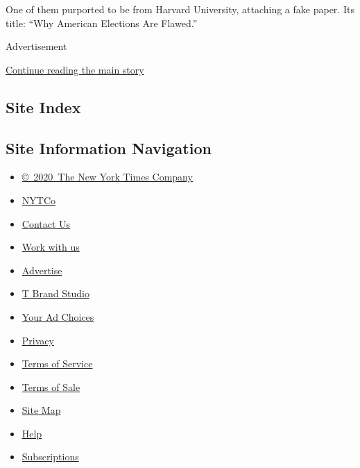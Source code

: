 One of them purported to be from Harvard University, attaching a fake
paper. Its title: ``Why American Elections Are Flawed.''

Advertisement

\protect\hyperlink{after-bottom}{Continue reading the main story}

\hypertarget{site-index}{%
\subsection{Site Index}\label{site-index}}

\hypertarget{site-information-navigation}{%
\subsection{Site Information
Navigation}\label{site-information-navigation}}

\begin{itemize}
\tightlist
\item
  \href{https://help.nytimes.com/hc/en-us/articles/115014792127-Copyright-notice}{©~2020~The
  New York Times Company}
\end{itemize}

\begin{itemize}
\tightlist
\item
  \href{https://www.nytco.com/}{NYTCo}
\item
  \href{https://help.nytimes.com/hc/en-us/articles/115015385887-Contact-Us}{Contact
  Us}
\item
  \href{https://www.nytco.com/careers/}{Work with us}
\item
  \href{https://nytmediakit.com/}{Advertise}
\item
  \href{http://www.tbrandstudio.com/}{T Brand Studio}
\item
  \href{https://www.nytimes.com/privacy/cookie-policy\#how-do-i-manage-trackers}{Your
  Ad Choices}
\item
  \href{https://www.nytimes.com/privacy}{Privacy}
\item
  \href{https://help.nytimes.com/hc/en-us/articles/115014893428-Terms-of-service}{Terms
  of Service}
\item
  \href{https://help.nytimes.com/hc/en-us/articles/115014893968-Terms-of-sale}{Terms
  of Sale}
\item
  \href{https://spiderbites.nytimes.com}{Site Map}
\item
  \href{https://help.nytimes.com/hc/en-us}{Help}
\item
  \href{https://www.nytimes.com/subscription?campaignId=37WXW}{Subscriptions}
\end{itemize}
